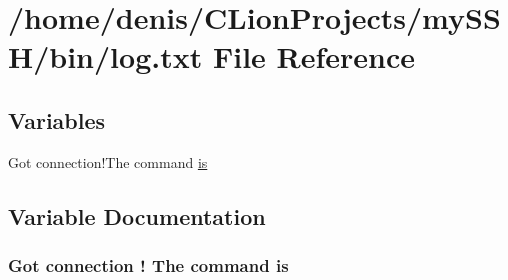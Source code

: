 \hypertarget{bin_2log_8txt}{}\section{/home/denis/\+C\+Lion\+Projects/my\+S\+S\+H/bin/log.txt File Reference}
\label{bin_2log_8txt}
\subsection*{Variables}
\begin{DoxyCompactItemize}
\item 
Got connection!\+The command \hyperlink{bin_2log_8txt_a9e671be5527b814092f6de952ccbec8c}{is}
\end{DoxyCompactItemize}


\subsection{Variable Documentation}
\subsubsection[{\texorpdfstring{is}{is}}]{\setlength{\rightskip}{0pt plus 5cm}Got connection ! The command is}\hypertarget{bin_2log_8txt_a9e671be5527b814092f6de952ccbec8c}{}\label{bin_2log_8txt_a9e671be5527b814092f6de952ccbec8c}
